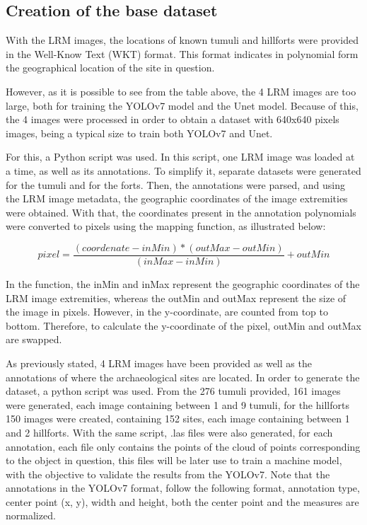 \subsection{Creation of the base dataset}

With the LRM images, the locations of known tumuli and hillforts were provided in the Well-Know Text (WKT) format. This format indicates in polynomial form the geographical location of the site in question.

However, as it is possible to see from the table above, the 4 LRM images are too large, both for training the YOLOv7 model and the Unet model. Because of this, the 4 images were processed in order to obtain a dataset with 640x640 pixels images, being a typical size to train both YOLOv7 and Unet.

For this, a Python script was used. In this script, one LRM image was loaded at a time, as well as its annotations. To simplify it, separate datasets were generated for the tumuli and for the forts. Then, the annotations were parsed, and using the LRM image metadata, the geographic coordinates of the image extremities were obtained. With that, the coordinates present in the annotation polynomials were converted to pixels using the mapping function, as illustrated below:

\begin{equation}
     pixel = \frac{(coordenate - inMin) * (outMax - outMin)} {(inMax - inMin)} + outMin
     \label{Map function}
\end{equation}

In the function, the inMin and inMax represent the geographic coordinates of the LRM image extremities, whereas the outMin and outMax represent the size of the image in pixels. However, in the y-coordinate, are counted from top to bottom. Therefore, to calculate the y-coordinate of the pixel, outMin and outMax are swapped.


As previously stated, 4 LRM images have been provided as well as the annotations of where the archaeological sites are located. In order to generate the dataset, a python script was used. From the 276 tumuli provided, 161 images were generated, each image containing between 1 and 9 tumuli, for the hillforts 150 images were created, containing 152 sites, each image containing between 1 and 2 hillforts. With the same script, .las files were also generated, for each annotation, each file only contains the points of the cloud of points corresponding to the object in question, this files will be later use to train a machine model, with the objective to validate the results from the YOLOv7. Note that the annotations in the YOLOv7 format, follow the following format, annotation type, center point (x, y), width and height, both the center point and the measures are normalized.

